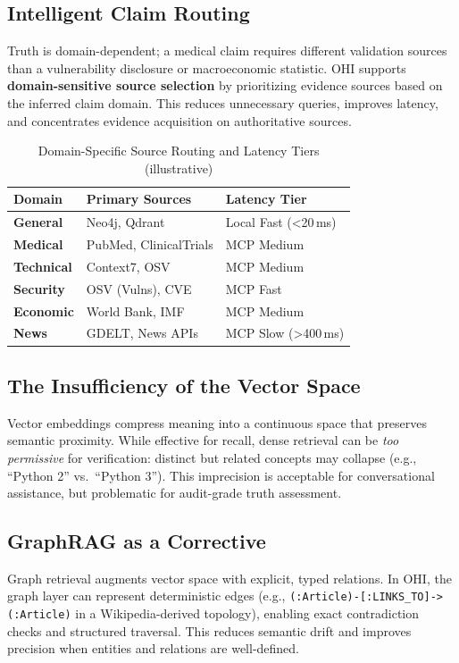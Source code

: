 \documentclass[10pt,a4paper,twocolumn]{article}
\begin{document}
\subsection{Intelligent Claim Routing}
Truth is domain-dependent; a medical claim requires different validation sources than a vulnerability disclosure or macroeconomic statistic. OHI supports \textbf{domain-sensitive source selection} by prioritizing evidence sources based on the inferred claim domain. This reduces unnecessary queries, improves latency, and concentrates evidence acquisition on authoritative sources.

\begin{table}[t]
\centering
\caption{Domain-Specific Source Routing and Latency Tiers (illustrative)}
\label{tab:routing}
\small
\begin{tabularx}{\columnwidth}{@{}llX@{}}
\toprule
\textbf{Domain} & \textbf{Primary Sources} & \textbf{Latency Tier} \\ \midrule
\textbf{General} & Neo4j, Qdrant & Local Fast (\textless{}20\,ms) \\
\textbf{Medical} & PubMed, ClinicalTrials & MCP Medium \\
\textbf{Technical} & Context7, OSV & MCP Medium \\
\textbf{Security} & OSV (Vulns), CVE & MCP Fast \\
\textbf{Economic} & World Bank, IMF & MCP Medium \\
\textbf{News} & GDELT, News APIs & MCP Slow (\textgreater{}400\,ms) \\
\bottomrule
\end{tabularx}
\end{table}

\subsection{The Insufficiency of the Vector Space}
Vector embeddings compress meaning into a continuous space that preserves semantic proximity. While effective for recall, dense retrieval can be \emph{too permissive} for verification: distinct but related concepts may collapse (e.g., \enquote{Python 2} vs.\ \enquote{Python 3}). This imprecision is acceptable for conversational assistance, but problematic for audit-grade truth assessment.

\subsection{GraphRAG as a Corrective}
Graph retrieval augments vector space with explicit, typed relations. In OHI, the graph layer can represent deterministic edges (e.g., \texttt{(:Article)-[:LINKS\_TO]->(:Article)} in a Wikipedia-derived topology), enabling exact contradiction checks and structured traversal. This reduces semantic drift and improves precision when entities and relations are well-defined.
\end{document}
